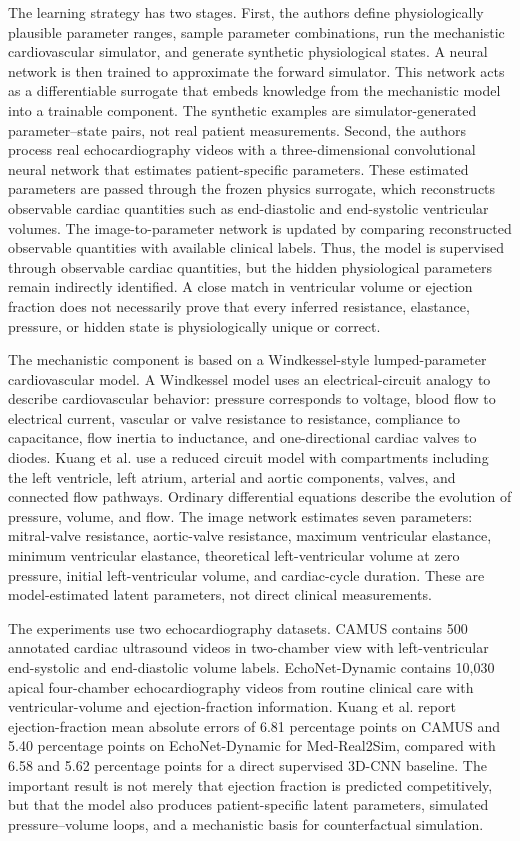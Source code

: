 The learning strategy has two stages. First, the authors define physiologically plausible parameter ranges, sample parameter combinations, run the mechanistic cardiovascular simulator, and generate synthetic physiological states. A neural network is then trained to approximate the forward simulator. This network acts as a differentiable surrogate that embeds knowledge from the mechanistic model into a trainable component. The synthetic examples are simulator-generated parameter--state pairs, not real patient measurements. Second, the authors process real echocardiography videos with a three-dimensional convolutional neural network that estimates patient-specific parameters. These estimated parameters are passed through the frozen physics surrogate, which reconstructs observable cardiac quantities such as end-diastolic and end-systolic ventricular volumes. The image-to-parameter network is updated by comparing reconstructed observable quantities with available clinical labels. Thus, the model is supervised through observable cardiac quantities, but the hidden physiological parameters remain indirectly identified. A close match in ventricular volume or ejection fraction does not necessarily prove that every inferred resistance, elastance, pressure, or hidden state is physiologically unique or correct.

The mechanistic component is based on a Windkessel-style lumped-parameter cardiovascular model. A Windkessel model uses an electrical-circuit analogy to describe cardiovascular behavior: pressure corresponds to voltage, blood flow to electrical current, vascular or valve resistance to resistance, compliance to capacitance, flow inertia to inductance, and one-directional cardiac valves to diodes. Kuang et al. use a reduced circuit model with compartments including the left ventricle, left atrium, arterial and aortic components, valves, and connected flow pathways. Ordinary differential equations describe the evolution of pressure, volume, and flow. The image network estimates seven parameters: mitral-valve resistance, aortic-valve resistance, maximum ventricular elastance, minimum ventricular elastance, theoretical left-ventricular volume at zero pressure, initial left-ventricular volume, and cardiac-cycle duration. These are model-estimated latent parameters, not direct clinical measurements.

The experiments use two echocardiography datasets. CAMUS contains 500 annotated cardiac ultrasound videos in two-chamber view with left-ventricular end-systolic and end-diastolic volume labels. EchoNet-Dynamic contains 10,030 apical four-chamber echocardiography videos from routine clinical care with ventricular-volume and ejection-fraction information. Kuang et al. report ejection-fraction mean absolute errors of 6.81 percentage points on CAMUS and 5.40 percentage points on EchoNet-Dynamic for Med-Real2Sim, compared with 6.58 and 5.62 percentage points for a direct supervised 3D-CNN baseline. The important result is not merely that ejection fraction is predicted competitively, but that the model also produces patient-specific latent parameters, simulated pressure--volume loops, and a mechanistic basis for counterfactual simulation.

